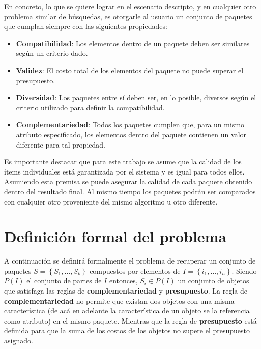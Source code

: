 En concreto, lo que se quiere lograr en el escenario descripto, y en cualquier otro problema similar de búsquedas, es otorgarle al usuario un conjunto de paquetes que cumplan siempre con las siguientes propiedades: 

\begin{itemize}
\item \textbf{Compatibilidad}: Los elementos dentro de un paquete deben ser similares según un criterio dado.
\item \textbf{Validez}: El costo total de los elementos del paquete no puede superar el presupuesto.
\item \textbf{Diversidad}: Los paquetes entre sí deben ser, en lo posible, diversos según el criterio utilizado para definir la compatibilidad.
\item \textbf{Complementariedad}: Todos los paquetes cumplen que, para un mismo atributo especificado, los elementos dentro del paquete contienen un valor diferente para tal propiedad.
\end{itemize}

Es importante destacar que para este trabajo se asume que la calidad de los ítems individuales está garantizada por el sistema y es igual para todos ellos. Asumiendo esta premisa se puede asegurar la calidad de cada paquete obtenido dentro del resultado final. Al mismo tiempo los paquetes podrán ser comparados con cualquier otro proveniente del mismo algoritmo u otro diferente.

\section{Definición formal del problema}\label{introduccion:problemaFormal}
A continuación se definirá formalmente el problema de recuperar un conjunto de paquetes $S = \left\{S_1, \ldots, S_k\right\}$ compuestos por elementos de $I=\left\{i_1,\ldots, i_n\right\}$. Siendo $P(I)$ el conjunto de partes de $I$ entonces,  $S_i \in P(I)$ un conjunto de objetos que satisfaga las reglas de \textbf{complementariedad} y \textbf{presupuesto}. La regla de \textbf{complementariedad} no permite que existan dos objetos con una misma característica (de acá en adelante la característica de un objeto se la referencia como atributo) en el mismo paquete. Mientras que la regla de \textbf{presupuesto} está definida para que la suma de los costos de los objetos no supere el presupuesto asignado.

